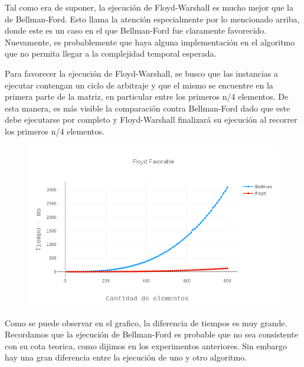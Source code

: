 Tal como era de suponer, la ejecución de Floyd-Warshall es mucho mejor que la de Bellman-Ford. Esto llama la atención especialmente por lo mencionado arriba, donde este es un caso en el que Bellman-Ford fue claramente favorecido. Nuevamente, es probablemente que haya alguna implementación en el algoritmo que no permita llegar a la complejidad temporal esperada.

 \label{favorableFloydWarshall}
Para favorecer la ejecución de Floyd-Warshall, se busco que las instancias a ejecutar contengan un ciclo de arbitraje y que el mismo se encuentre en la primera parte de la matriz, en particular entre los primeros n/4 elementos. De esta manera, es más visible la comparación contra Bellman-Ford dado que este debe ejecutarse por completo y Floyd-Warshall finalizará su ejecución al recorrer los primeros n/4 elementos.

\begin{figure}[H]
  \begin{center}
	\includegraphics[scale=0.4]{images/experimentos/arbitraje/floydFavorable.png}
  \end{center}
\end{figure}

Como se puede observar en el grafico, la diferencia de tiempos es muy grande. Recordamos que la ejecución de Bellman-Ford es probable que no sea consistente con su cota teorica, como dijimos en los experimentos anteriores. Sin embargo hay una gran diferencia entre la ejecución de uno y otro algoritmo.